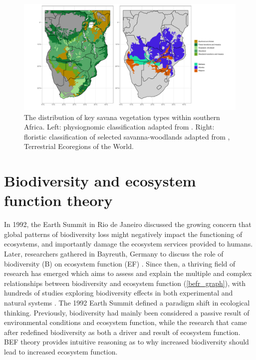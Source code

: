 \begin{refsection}
\begin{figure}[!htb]
\centering
	\includegraphics[width=\textwidth]{img/saf_map_both}
	\caption{The distribution of key savana vegetation types within southern Africa. Left: physiognomic classification adapted from \citet{White1983}. Right: floristic classification of selected savanna-woodlands adapted from \citet{Dinerstein2017}, Terrestrial Ecoregions of the World.}
	\label{saf_map}
\end{figure}

\section{Biodiversity and ecosystem function theory}

In 1992, the Earth Summit in Rio de Janeiro discussed the growing concern that global patterns of biodiversity loss might negatively impact the functioning of ecosystems, and importantly damage the ecosystem services provided to humans. Later, researchers gathered in Bayreuth, Germany to discuss the role of biodiversity (B) on ecosystem function (EF) \citep{Schulze1993}. Since then, a thriving field of research has emerged which aims to assess and explain the multiple and complex relationships between biodiversity and ecosystem function (\autoref{befr_graph}), with hundreds of studies exploring biodiversity effects in both experimental and natural systems \citep{Plas2019, Newbold2016, Tilman2014}. The 1992 Earth Summit defined a paradigm shift in ecological thinking. Previously, biodiversity had mainly been considered a passive result of environmental conditions and ecosystem function, while the research that came after redefined biodiversity as both a driver and result of ecosystem function. BEF theory provides intuitive reasoning as to why increased biodiversity should lead to increased ecosystem function. 


\end{refsection}
